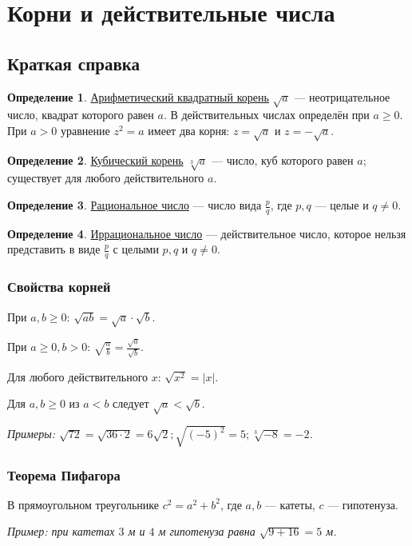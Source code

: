\documentclass[12pt,a4paper]{article}
\theoremstyle{definition}
\newtheorem{definition}{Определение}[section]
\theoremstyle{plain}
\theoremstyle{remark}
\newcommand{\term}[1]{\uline{#1}}
\begin{document}
\section{Корни и действительные числа}
\subsection*{Краткая справка}
\begin{definition}\term{Арифметический квадратный корень} \(\sqrt{a}\) — неотрицательное число, квадрат которого равен \(a\). В действительных числах определён при \(a \ge  0\). При \(a>0\) уравнение \(z^2=a\) имеет два корня: \(z=\sqrt a\) и \(z=-\sqrt a\).\end{definition}
\begin{definition}\term{Кубический корень} \(\sqrt[3]{a}\) — число, куб которого равен \(a\); существует для любого действительного \(a\).\end{definition}
\begin{definition}\term{Рациональное число} — число вида \(\frac{p}{q}\), где \(p,\allowbreak q\) — целые и \(q \ne  0\).\end{definition}
\begin{definition}\term{Иррациональное число} — действительное число, которое нельзя представить в виде \(\frac{p}{q}\) с целыми \(p,q\) и \(q\ne0\).\end{definition}
\subsubsection*{Свойства корней}
При \(a,\allowbreak b \ge 0\): \(\sqrt{ab} = \sqrt{a} \cdot \sqrt{b}\).\par
При \(a \ge 0,\allowbreak b > 0\): \(\sqrt{\frac{a}{b}} = \frac{\sqrt{a}}{\sqrt{b}}\).\par
Для любого действительного \(x\): \(\sqrt{x^{2}} = | x |\).\par
Для \(a,\allowbreak b \ge  0\) из \(a < b\) следует \(\sqrt{a} < \sqrt{b}\).\par
{\small\textit{Примеры: \(\sqrt{72} = \sqrt{36 \cdot  2} = 6 \sqrt{2};\allowbreak \sqrt{(- 5)^{2}} = 5;\allowbreak \sqrt[3]{- 8} = - 2\).}}\par
\subsubsection*{Теорема Пифагора}
В прямоугольном треугольнике \(c^{2} = a^{2} + b^{2}\), где \(a,\allowbreak b\) — катеты, \(c\) — гипотенуза.\par
{\small\textit{Пример: при катетах \(3\) м и \(4\) м гипотенуза равна \(\sqrt{9 + 16} = 5\) м.}}\par
\end{document}
